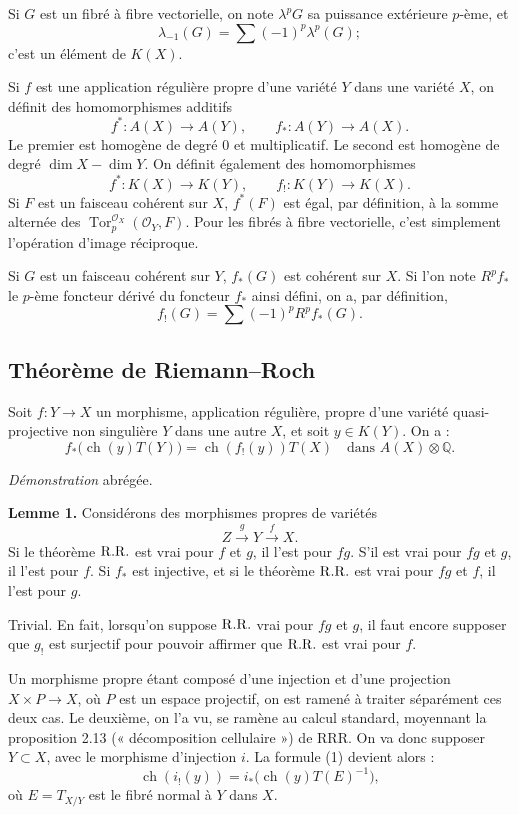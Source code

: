 \documentclass[11pt]{article}
\newcommand{\ch}{\operatorname{ch}}
\newcommand{\Tor}{\operatorname{Tor}}
\newcommand{\RRR}{\mathrm{RRR}}
\providecommand{\ch}{\operatorname{ch}}
\providecommand{\Tor}{\operatorname{Tor}}
\begin{document}
Si \(G\) est un fibré à fibre vectorielle, on note \(\lambda^pG\) sa puissance extérieure \(p\)-ème, et
\[
  \lambda_{-1}(G)=\sum(-1)^p\lambda^p(G);
\]
c'est un élément de \(K(X)\).

Si \(f\) est une application régulière propre d'une variété \(Y\) dans une variété \(X\), on définit des homomorphismes additifs
\[
  f^*:A(X)\longrightarrow A(Y),\qquad
  f_*:A(Y)\longrightarrow A(X).
\]
Le premier est homogène de degré \(0\) et multiplicatif. Le second est homogène de degré \(\dim X-\dim Y\). On définit également des homomorphismes
\[
  f^*:K(X)\longrightarrow K(Y),\qquad
  f_!:K(Y)\longrightarrow K(X).
\]
Si \(F\) est un faisceau cohérent sur \(X\), \(f^*(F)\) est égal, par définition, à la somme alternée des \(\Tor_p^{\mathcal O_X}(\mathcal O_Y,F)\). Pour les fibrés à fibre vectorielle, c'est simplement l'opération d'image réciproque.

Si \(G\) est un faisceau cohérent sur \(Y\), \(f_*(G)\) est cohérent sur \(X\). Si l'on note \(R^pf_*\) le \(p\)-ème foncteur dérivé du foncteur \(f_*\) ainsi défini, on a, par définition,
\[
  f_!(G)=\sum(-1)^p R^pf_*(G).
\]

\subsection*{Théorème de Riemann--Roch}
Soit \(f:Y\to X\) un morphisme, application régulière, propre d'une variété quasi-projective non singulière \(Y\) dans une autre \(X\), et soit \(y\in K(Y)\). On a :
\begin{equation}\tag{1}
  f_*\bigl(\ch(y)T(Y)\bigr)=\ch(f_!(y))T(X)
  \quad\text{dans } A(X)\otimes\mathbb Q.
\end{equation}

\emph{Démonstration} abrégée.

\textbf{Lemme 1.} Considérons des morphismes propres de variétés
\[
  Z \xrightarrow{g} Y \xrightarrow{f} X.
\]
Si le théorème \(\mathrm{R.R.}\) est vrai pour \(f\) et \(g\), il l'est pour \(fg\). S'il est vrai pour \(fg\) et \(g\), il l'est pour \(f\). Si \(f_*\) est injective, et si le théorème \(\mathrm{R.R.}\) est vrai pour \(fg\) et \(f\), il l'est pour \(g\).

Trivial. En fait, lorsqu'on suppose \(\mathrm{R.R.}\) vrai pour \(fg\) et \(g\), il faut encore supposer que \(g_!\) est surjectif pour pouvoir affirmer que \(\mathrm{R.R.}\) est vrai pour \(f\).

Un morphisme propre étant composé d'une injection et d'une projection \(X\times P\to X\), où \(P\) est un espace projectif, on est ramené à traiter séparément ces deux cas. Le deuxième, on l'a vu, se ramène au calcul standard, moyennant la proposition 2.13 (« décomposition cellulaire ») de \(\RRR\). On va donc supposer \(Y\subset X\), avec le morphisme d'injection \(i\). La formule (1) devient alors :
\begin{equation}\tag{2}
  \ch(i_!(y))=i_*\bigl(\ch(y)T(E)^{-1}\bigr),
\end{equation}
où \(E=T_{X/Y}\) est le fibré normal à \(Y\) dans \(X\).
\end{document}
